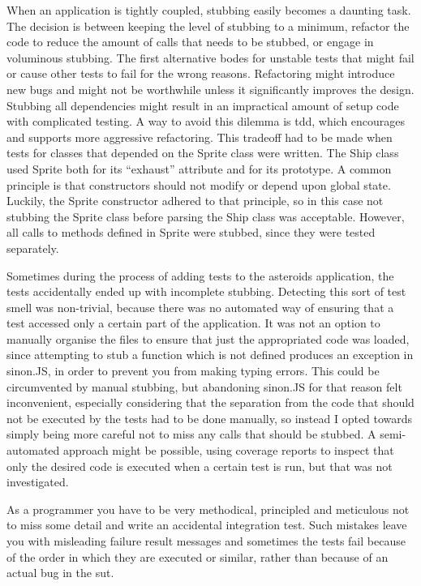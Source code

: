 \documentclass[11pt]{article}
\begin{document}
When an application is tightly coupled, stubbing easily becomes a daunting task. The decision is between keeping the level of stubbing to a minimum, refactor the code to reduce the amount of calls that needs to be stubbed, or engage in voluminous stubbing. The first alternative bodes for unstable tests that might fail or cause other tests to fail for the wrong reasons. Refactoring might introduce new bugs and might not be worthwhile unless it significantly improves the design. Stubbing all dependencies might result in an impractical amount of setup code with complicated testing. A way to avoid this dilemma is \gls{tdd}, which encourages and supports more aggressive refactoring. This tradeoff had to be made when tests for classes that depended on the Sprite class were written. The Ship class used Sprite both for its ``exhaust'' attribute and for its prototype. A common principle is that constructors should not modify or depend upon global state. Luckily, the Sprite constructor adhered to that principle, so in this case not stubbing the Sprite class before parsing the Ship class was acceptable. However, all calls to methods defined in Sprite were stubbed, since they were tested separately.

Sometimes during the process of adding tests to the asteroids application, the tests accidentally ended up with incomplete stubbing. Detecting this sort of test smell was non-trivial, because there was no automated way of ensuring that a test accessed only a certain part of the application. It was not an option to manually organise the files to ensure that just the appropriated code was loaded, since attempting to stub a function which is not defined produces an exception in sinon.JS, in order to prevent you from making typing errors. This could be circumvented by manual stubbing, but abandoning sinon.JS for that reason felt inconvenient, especially considering that the separation from the code that should not be executed by the tests had to be done manually, so instead I opted towards simply being more careful not to miss any calls that should be stubbed. A semi-automated approach might be possible, using coverage reports to inspect that only the desired code is executed when a certain test is run, but that was not investigated.

As a programmer you have to be very methodical, principled and meticulous not to miss some detail and write an accidental integration test. Such mistakes leave you with misleading failure result messages and sometimes the tests fail because of the order in which they are executed or similar, rather than because of an actual bug in the \gls{sut}.
\end{document}
